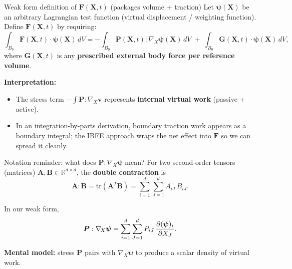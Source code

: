\documentclass[aspectratio=169]{beamer}
\newcommand{\X}{\bm{X}}
\newcommand{\Gext}{\bm{G}}         %
\newcommand{\Vtest}{\bm{v}}        %
\newcommand{\Pten}{\bm{P}}        %
\newcommand{\FLag}{\bm{F}}       %
\begin{document}
\begin{frame}{Weak form definition of \(\FLag(\X,t)\) (packages volume + traction)}
\small
Let \(\bm{\psi}(\X)\) be an arbitrary Lagrangian test function (virtual displacement / weighting function).
Define \(\FLag(\X,t)\) by requiring:
\[
\int_{B_0} \FLag(\X,t)\cdot \bm{\psi}(\X)\,dV
=
-\int_{B_0} \Pten(\X,t) : \nabla_{\!X}\bm{\psi}(\X)\,dV
\;+\;
\int_{B_0} \Gext(\X,t)\cdot \bm{\psi}(\X)\,dV,
\]
where \(\Gext(\X,t)\) is any \textbf{prescribed external body force per reference volume}.

\medskip
\textbf{Interpretation:}
\begin{itemize}
\item The stress term \(-\int \Pten:\nabla_X \Vtest\) represents \textbf{internal virtual work} (passive + active).
\item In an integration-by-parts derivation, boundary traction work appears as a boundary integral;
the IBFE approach wraps the net effect into \(\FLag\) so we can spread it cleanly.
\end{itemize}
\end{frame}

\begin{frame}{Notation reminder: what does \(\Pten:\nabla_{\!X}\bm{\psi}\) mean?}
\small
For two second-order tensors (matrices) \(\bm{A},\bm{B}\in\mathbb{R}^{d\times d}\),
the \textbf{double contraction} is
\[
\bm{A}:\bm{B}
=
\mathrm{tr}(\bm{A}^T\bm{B})
=
\sum_{i=1}^d\sum_{J=1}^d A_{iJ}\,B_{iJ}.
\]

\medskip
In our weak form,
\[
\Pten : \nabla_{\!X}\bm{\psi}
=
\sum_{i=1}^d\sum_{J=1}^d P_{iJ}\,\pdv{(\bm{\psi})_i}{X_J}.
\]

\medskip
\textbf{Mental model:} stress \(\Pten\) pairs with \(\nabla_X \bm{\psi}\) to produce a scalar
density of virtual work.
\end{frame}
\end{document}
